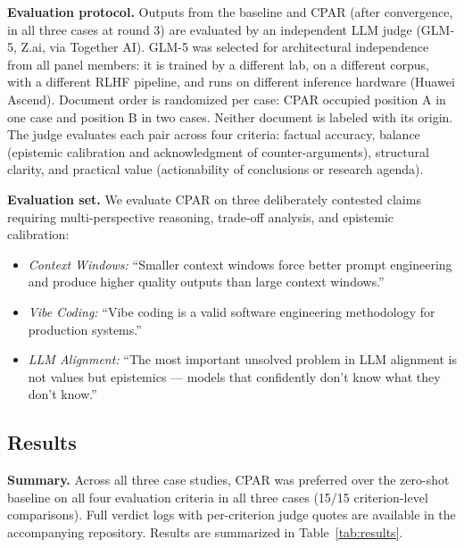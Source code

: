 \documentclass[11pt, a4paper]{article}
\begin{document}
\textbf{Evaluation protocol.} Outputs from the baseline and CPAR (after convergence, in all three cases at round 3) are evaluated by an independent LLM judge (GLM-5, Z.ai, via Together AI). GLM-5 was selected for architectural independence from all panel members: it is trained by a different lab, on a different corpus, with a different RLHF pipeline, and runs on different inference hardware (Huawei Ascend). Document order is randomized per case: CPAR occupied position A in one case and position B in two cases. Neither document is labeled with its origin. The judge evaluates each pair across four criteria: factual accuracy, balance (epistemic calibration and acknowledgment of counter-arguments), structural clarity, and practical value (actionability of conclusions or research agenda).

\textbf{Evaluation set.} We evaluate CPAR on three deliberately contested claims requiring multi-perspective reasoning, trade-off analysis, and epistemic calibration:
\begin{itemize}
    \item \textit{Context Windows:} ``Smaller context windows force better prompt engineering and produce higher quality outputs than large context windows.''
    \item \textit{Vibe Coding:} ``Vibe coding is a valid software engineering methodology for production systems.''
    \item \textit{LLM Alignment:} ``The most important unsolved problem in LLM alignment is not values but epistemics --- models that confidently don't know what they don't know.''
\end{itemize}

\subsection{Results}

\textbf{Summary.} Across all three case studies, CPAR was preferred over the zero-shot baseline on all four evaluation criteria in all three cases (15/15 criterion-level comparisons). Full verdict logs with per-criterion judge quotes are available in the accompanying repository. Results are summarized in Table~\ref{tab:results}.
\end{document}
